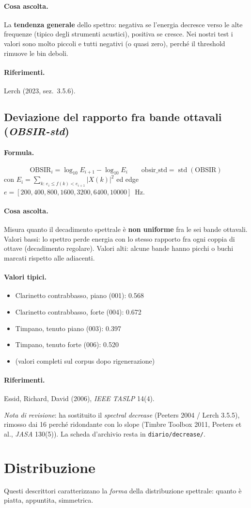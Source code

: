 \documentclass[a4paper,11pt]{article}
\newcommand{\desc}[1]{\subsection{#1}}
\newcommand{\formula}{\paragraph{Formula.}}
\newcommand{\ascolta}{\paragraph{Cosa ascolta.}}
\newcommand{\range}{\paragraph{Valori tipici.}}
\newcommand{\rif}{\paragraph{Riferimenti.}}
\begin{document}
\ascolta
La \textbf{tendenza generale} dello spettro: negativa se l'energia decresce
verso le alte frequenze (tipico degli strumenti acustici), positiva se
cresce. Nei nostri test i valori sono molto piccoli e tutti negativi
(o quasi zero), perché il threshold rimuove le bin deboli.

\rif Lerch (2023, sez.~3.5.6).

\desc{Deviazione del rapporto fra bande ottavali (\emph{OBSIR-std})}

\formula
\[
  \text{OBSIR}_i = \log_{10} E_{i+1} - \log_{10} E_i
  \qquad
  \text{obsir\_std} = \operatorname{std}(\text{OBSIR})
\]
con $E_i = \sum_{k:\,e_i \le f(k) < e_{i+1}} |X(k)|^2$ ed
edge $e = [200, 400, 800, 1600, 3200, 6400, 10000]$~Hz.

\ascolta
Misura quanto il decadimento spettrale è \textbf{non uniforme} fra le
sei bande ottavali. Valori bassi: lo spettro perde energia con lo
stesso rapporto fra ogni coppia di ottave (decadimento regolare).
Valori alti: alcune bande hanno picchi o buchi marcati rispetto alle
adiacenti.

\range
\begin{itemize}[nosep]
  \item Clarinetto contrabbasso, piano (001): 0.568
  \item Clarinetto contrabbasso, forte (004): 0.672
  \item Timpano, tenuto piano (003): 0.397
  \item Timpano, tenuto forte (006): 0.520
  \item (valori completi sul corpus dopo rigenerazione)
\end{itemize}

\rif Essid, Richard, David (2006), \emph{IEEE TASLP} 14(4).

\bigskip
\noindent\textit{Nota di revisione}: ha sostituito il \emph{spectral
decrease} (Peeters 2004 / Lerch 3.5.5), rimosso dai 16 perché ridondante
con lo slope (Timbre Toolbox 2011, Peeters et al., \emph{JASA} 130(5)).
La scheda d'archivio resta in \texttt{diario/decrease/}.


\section{Distribuzione}

Questi descrittori caratterizzano la \emph{forma} della distribuzione
spettrale: quanto è piatta, appuntita, simmetrica.
\end{document}
